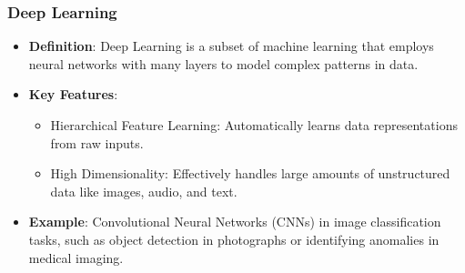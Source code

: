 \documentclass{beamer}
\begin{document}
\begin{frame}[fragile]
    \frametitle{Deep Learning}
    \begin{itemize}
        \item \textbf{Definition}: Deep Learning is a subset of machine learning that employs neural networks with many layers to model complex patterns in data.
        \item \textbf{Key Features}:
        \begin{itemize}
            \item Hierarchical Feature Learning: Automatically learns data representations from raw inputs.
            \item High Dimensionality: Effectively handles large amounts of unstructured data like images, audio, and text.
        \end{itemize}
        \item \textbf{Example}: Convolutional Neural Networks (CNNs) in image classification tasks, such as object detection in photographs or identifying anomalies in medical imaging.
    \end{itemize}
\end{frame}
\end{document}
